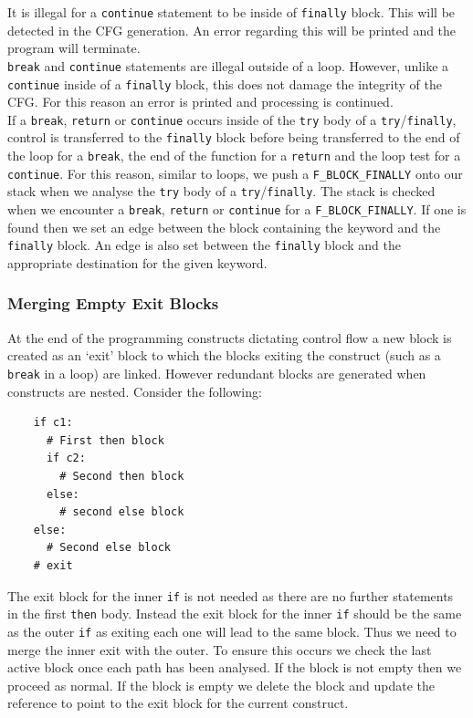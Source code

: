 \documentclass[12pt, titlepage]{article}
\begin{document}
\indent It is illegal for a \texttt{continue} statement to be inside of \texttt{finally} block. This will be detected in the CFG generation. An error regarding this will be printed and the program will terminate. \\
\indent \texttt{break} and \texttt{continue} statements are illegal outside of a loop. However, unlike a \texttt{continue} inside of a \texttt{finally} block, this does not damage the integrity of the CFG. For this reason an error is printed and processing is continued. \\
\indent If a \texttt{break}, \texttt{return} or \texttt{continue} occurs inside of the \texttt{try} body of a \texttt{try}/\texttt{finally}, control is transferred to the \texttt{finally} block before being transferred to the end of the loop for a \texttt{break}, the end of the function for a \texttt{return} and the loop test for a \texttt{continue}. For this reason, similar to loops, we push a \texttt{F\_BLOCK\_FINALLY} onto our stack when we analyse the \texttt{try} body of a \texttt{try}/\texttt{finally}. The stack is checked when we encounter a \texttt{break}, \texttt{return} or \texttt{continue} for a \texttt{F\_BLOCK\_FINALLY}. If one is found then we set an edge between the block containing the keyword and the \texttt{finally} block. An edge is also set between the \texttt{finally} block and the appropriate destination for the given keyword.



\subsubsection{Merging Empty Exit Blocks}
At the end of the programming constructs dictating control flow a new block is created as an `exit' block to which the blocks exiting the construct (such as a \texttt{break} in a loop) are linked. However redundant blocks are generated when constructs are nested. Consider the following:
\begin{lstlisting}
    if c1:
      # First then block
      if c2:
        # Second then block
      else:
        # second else block
    else:
      # Second else block
    # exit
\end{lstlisting}
The exit block for the inner \texttt{if} is not needed as there are no further statements in the first \texttt{then} body. Instead the exit block for the inner \texttt{if} should be the same as the outer \texttt{if} as exiting each one will lead to the same block. Thus we need to merge the inner exit with the outer. To ensure this occurs we check the last active block once each path has been analysed. If the block is not empty then we proceed as normal. If the block is empty we delete the block and update the reference to point to the exit block for the current construct.
\end{document}

